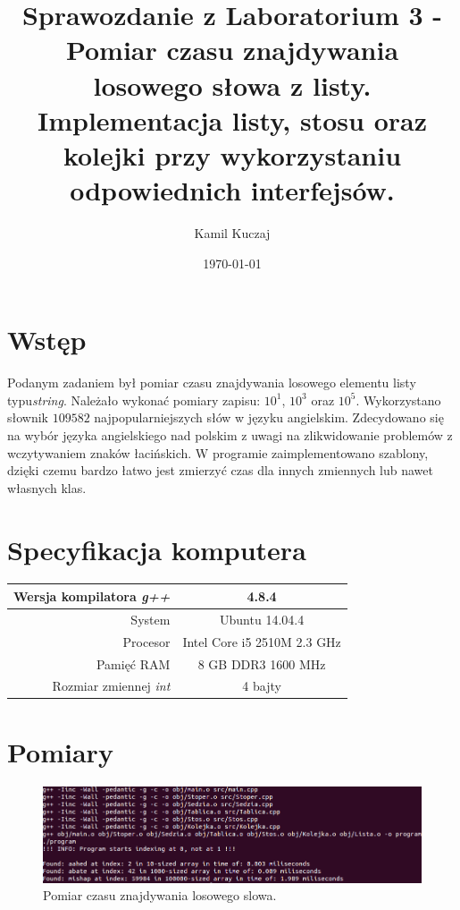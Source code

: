 \documentclass[11pt,a4paper]{article}
\author{Kamil Kuczaj}
\title{Sprawozdanie z Laboratorium 3 - Pomiar czasu znajdywania losowego słowa z listy.\\Implementacja listy, stosu oraz kolejki przy wykorzystaniu odpowiednich interfejsów.}
\date{\today}
\begin{document}
\maketitle

\section{Wstęp}
Podanym zadaniem był pomiar czasu znajdywania losowego elementu listy typu\textit{string}. Należało wykonać pomiary zapisu: $10^1$, $10^3$ oraz $10^5$. Wykorzystano słownik $109582$ najpopularniejszych słów w języku angielskim. Zdecydowano się na wybór języka angielskiego nad polskim z uwagi na zlikwidowanie problemów z wczytywaniem znaków łacińskich. W programie zaimplementowano szablony, dzięki czemu bardzo łatwo jest zmierzyć czas dla innych zmiennych lub nawet własnych klas. 

\section{Specyfikacja komputera}

\begin{center}
	\begin{tabular}{| r | c |}
	\hline
	Wersja kompilatora \textit{g++} & 4.8.4 \\ \hline
	System & Ubuntu 14.04.4 \\ \hline
	Procesor	 & Intel Core i5 2510M 2.3 GHz \\ \hline
	Pamięć RAM & 8 GB DDR3 1600 MHz \\ \hline
	Rozmiar zmiennej \textit{int} & 4 bajty \\ \hline
	\end{tabular}
\end{center}

\newpage

\section{Pomiary}
\bigskip
\begin{figure}[h]
	\centering
		\includegraphics[scale=0.47]{../wykresy/Lista_znajdywanie.png}
		\caption	{Pomiar czasu znajdywania losowego slowa.}	
\end{figure}
\end{document}

